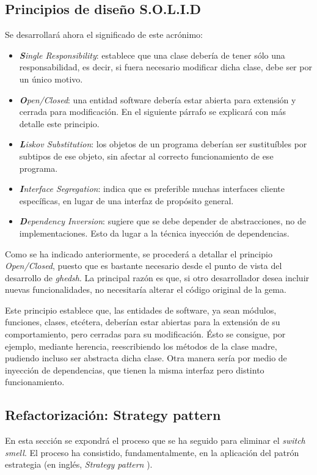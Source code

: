 \subsection{Principios de diseño S.O.L.I.D}
\label{2.2.1}
Se desarrollará ahora el significado de este acrónimo:
\begin{itemize}
  \item {\it \textbf{S}ingle Responsibility}: establece que una clase debería de tener sólo una responsabilidad, es decir, si fuera necesario modificar dicha clase, debe ser por un único motivo.
  \item {\it \textbf{O}pen/Closed}: una entidad software debería estar abierta para extensión y cerrada para modificación. En el siguiente párrafo se explicará con más detalle este principio.
  \item {\it \textbf{L}iskov Substitution}: los objetos de un programa deberían ser sustituíbles por subtipos de ese objeto, sin afectar al correcto funcionamiento de ese programa.
  \item {\it \textbf{I}nterface Segregation}: indica que es preferible muchas interfaces cliente específicas, en lugar de una interfaz de propósito general.
  \item {\it \textbf{D}ependency Inversion}: sugiere que se debe depender de abstracciones, no de implementaciones. Esto da lugar a la técnica inyección de dependencias.
\end{itemize}
\bigskip

Como se ha indicado anteriormente, se procederá a detallar el principio {\it Open/Closed}, puesto que es bastante necesario desde el punto de vista del desarrollo de {\it ghedsh}. La principal razón es que, si otro desarrollador desea incluir nuevas funcionalidades, no necesitaría alterar el código original de la gema.
\bigskip

Este principio establece que, las entidades de software, ya sean módulos, funciones, clases, etcétera, deberían estar abiertas para la extensión de su comportamiento, pero cerradas para su modificación. Ésto se consigue, por ejemplo, mediante herencia, reescribiendo los métodos de la clase madre, pudiendo incluso ser abstracta dicha clase.
Otra manera sería por medio de inyección de dependencias, que tienen la misma interfaz pero distinto funcionamiento.

\subsection{Refactorización: Strategy pattern}
\label{2.2.2}
En esta sección se expondrá el proceso que se ha seguido para eliminar el {\it switch smell}. El proceso ha consistido, fundamentalmente,
en la aplicación del patrón estrategia (en inglés, {\it Strategy pattern} \cite{jspatterns:2012}).
\bigskip

